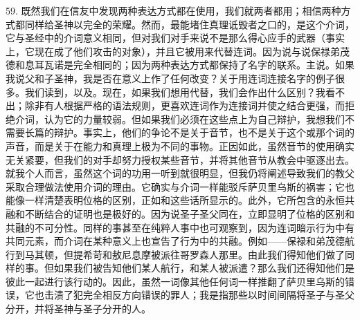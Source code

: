 59. 既然我们在信友中发现两种表达方式都在使用，我们就两者都用；相信两种方式都同样给圣神以完全的荣耀。然而，最能堵住真理诋毁者之口的，是这个介词，它与圣经中的介词意义相同，但对我们对手来说不是那么得心应手的武器（事实上，它现在成了他们攻击的对象），并且它被用来代替连词。因为说与说保禄弟茂德和息耳瓦诺是完全相同的；因为两种表达方式都保持了名字的联系。主说。如果我说父和子圣神，我是否在意义上作了任何改变？关于用连词连接名字的例子很多。我们读到，以及。现在，如果我们想用代替，我们会作出什么区别？我看不出；除非有人根据严格的语法规则，更喜欢连词作为连接词并使之结合更强，而拒绝介词，认为它的力量较弱。但如果我们必须在这些点上为自己辩护，我想我们不需要长篇的辩护。事实上，他们的争论不是关于音节，也不是关于这个或那个词的声音，而是关于在能力和真理上极为不同的事物。正因如此，虽然音节的使用确实无关紧要，但我们的对手却努力授权某些音节，并将其他音节从教会中驱逐出去。就我个人而言，虽然这个词的功用一听到就很明显，但我仍将阐述导致我们的教父采取合理做法使用介词的理由。它确实与介词一样能驳斥萨贝里乌斯的祸害；它也能像一样清楚表明位格的区别，正如和这些话所显示的。此外，它所包含的永恒共融和不断结合的证明也是极好的。因为说圣子圣父同在，立即显明了位格的区别和共融的不可分性。同样的事甚至在纯粹人事中也可观察到，因为连词暗示行为中有共同元素，而介词在某种意义上也宣告了行为中的共融。例如——保禄和弟茂德航行到马其顿，但提希苛和敖尼息摩被派往哥罗森人那里。由此我们得知他们做了同样的事。但如果我们被告知他们某人航行，和某人被派遣？那么我们还得知他们是彼此一起进行该行动的。因此，虽然一词像其他任何词一样推翻了萨贝里乌斯的错误，它也击溃了犯完全相反方向错误的罪人；我是指那些以时间间隔将圣子与圣父分开，并将圣神与圣子分开的人。\par

